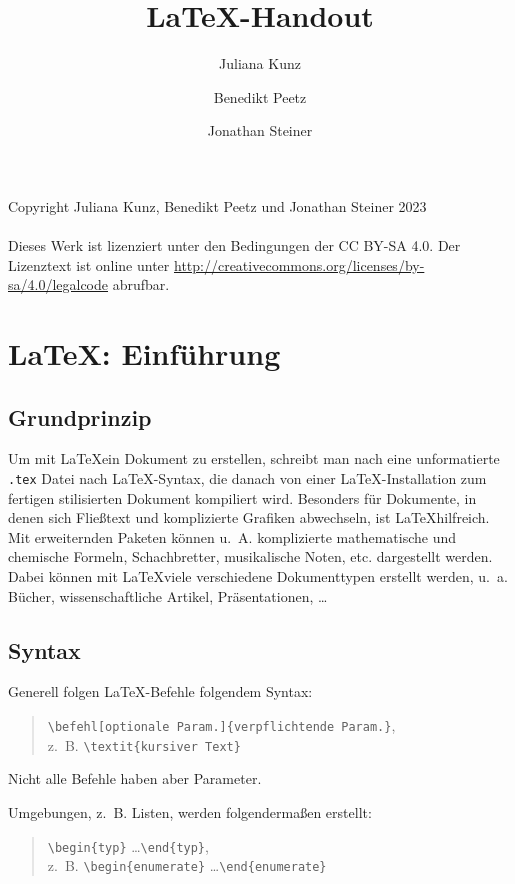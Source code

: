 \documentclass[ngerman]{scrreport}
\date{\DTMDate{2023-06-23}}
\title{\LaTeX{}-Handout}
\author{Juliana Kunz \and Benedikt Peetz \and Jonathan Steiner}
\date{\DTMDate{2023-06-23}}
\begin{document}
\maketitle
\tableofcontents
\vspace*{\fill}
Copyright \textcopyright{} Juliana Kunz, Benedikt Peetz und Jonathan Steiner 2023\\
\ \\
Dieses Werk ist lizenziert unter den Bedingungen der CC BY-SA 4.0.
Der Lizenztext ist online unter \url{http://creativecommons.org/licenses/by-sa/4.0/legalcode} abrufbar.

\chapter{\centering\LaTeX: Einführung}

\section{Grundprinzip}
Um mit \LaTeX ein Dokument zu erstellen, schreibt man nach eine unformatierte \texttt{.tex} Datei nach \LaTeX-Syntax, die danach von einer \LaTeX-Installation zum fertigen stilisierten Dokument kompiliert wird.
Besonders für Dokumente, in denen sich Fließtext und komplizierte Grafiken abwechseln, ist \LaTeX hilfreich. Mit erweiternden Paketen können u.~A. komplizierte mathematische und chemische Formeln, Schachbretter, musikalische Noten, etc. dargestellt werden.
Dabei können mit \LaTeX viele verschiedene Dokumenttypen erstellt werden, u.~a. Bücher, wissenschaftliche Artikel, Präsentationen, \dots

\section{Syntax}

Generell folgen \LaTeX-Befehle folgendem Syntax:

\color{blue}
\begin{quote}
	\verb|\befehl[optionale Param.]{verpflichtende Param.}|{\color{black}, \\z.~B.} \verb|\textit{kursiver Text}|
\end{quote}
\color{black}
Nicht alle Befehle haben aber Parameter.

Umgebungen, z.~B. Listen, werden folgendermaßen erstellt:

\color{blue}
\begin{quote}
	\verb|\begin{typ}| \dots \verb|\end{typ}|{\color{black}, \\z.~B.} \verb|\begin{enumerate}| \dots \verb|\end{enumerate}|
\end{quote}
\color{black}
\end{document}

